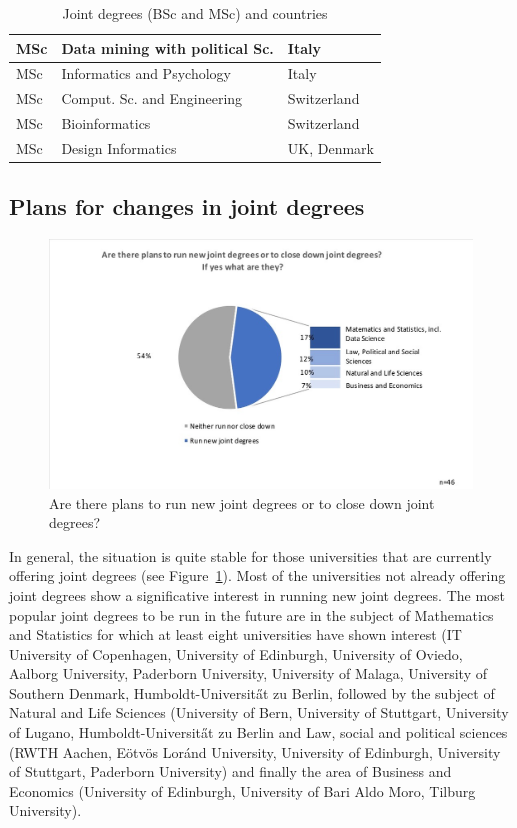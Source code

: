 \begin{table}
\begin{center}
\begin{tabular}  {|l|l|l|}
\hline
MSc & Data mining with political Sc.  &  Italy\\
\hline
MSc&  Informatics and Psychology   &  Italy\\
\hline
MSc & Comput. Sc. and Engineering & Switzerland\\
\hline
MSc& Bioinformatics  & Switzerland\\
\hline
MSc & Design Informatics    & UK, Denmark\\
\hline
\end{tabular}
\vspace*{.4cm}
\end{center}
\caption{Joint degrees (BSc and MSc) and countries}
\label{ tab:joint}
\end{table}


\subsection{Plans for changes in joint degrees} 

\begin{figure}[h]
\includegraphics[width = \linewidth]{charts/2b.jpg}
\caption{Are there plans to run new joint degrees or to close down joint degrees?}
\label{sect3:change}
\end{figure}

In general, the situation is  quite stable for those universities that are currently offering joint degrees (see Figure~\ref{sect3:change}). Most of the universities not already offering joint degrees show a significative interest in running new joint degrees. The most popular joint degrees to be run in the future are in the subject of Mathematics and Statistics for which at least eight universities have shown interest (IT University of Copenhagen, University of Edinburgh, University of Oviedo, Aalborg University, Paderborn University, University of Malaga, University of Southern Denmark, Humboldt-Universit\H at zu Berlin, followed by the subject of 
Natural and Life Sciences (University of Bern, University of Stuttgart, University of Lugano, Humboldt-Universit\H at zu Berlin and 
Law, social and political sciences (RWTH Aachen, E\" otv\"os Lor\'and University, University of Edinburgh, University of Stuttgart, Paderborn University) and finally the area of  Business and Economics (University of Edinburgh, University of Bari Aldo Moro, Tilburg University). 

